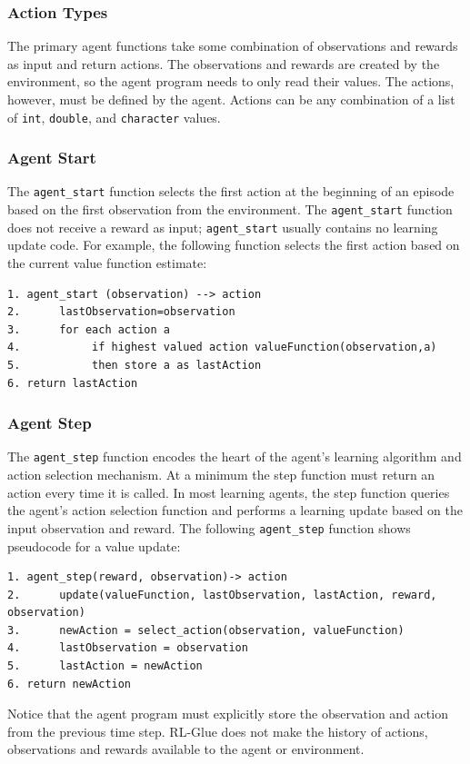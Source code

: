 \documentclass[11pt]{article}
\begin{document}
\subsubsection{Action Types}
The primary agent functions take some combination of observations and rewards as input and return actions. The observations and rewards are created by the environment, so the agent program needs to only read their values. The actions, however, must be defined by the agent. Actions can be any combination of a list of \texttt{int}, \texttt{double}, and \texttt{character} values.

\subsubsection{Agent Start}
The \texttt{agent\_start} function selects the first action at the beginning of an episode based on the first observation from the environment. The \texttt{agent\_start} function does not receive a reward as input; \texttt{agent\_start} usually contains no learning update code. For example, the following function selects the first action based on the current value function estimate:
\begin{verbatim}
1. agent_start (observation) --> action
2.      lastObservation=observation
3.      for each action a
4.           if highest valued action valueFunction(observation,a)
5.           then store a as lastAction
6. return lastAction
\end{verbatim}

\subsubsection{Agent Step}
The \texttt{agent\_step} function encodes the heart of the agent's learning algorithm and action selection mechanism. At a minimum the step function must return an action every time it is called. In most learning agents, the step function queries the agent's action selection function and performs a learning update based on the input observation and reward. The following \texttt{agent\_step} function shows pseudocode for a value update:
\begin{verbatim}
1. agent_step(reward, observation)-> action
2.      update(valueFunction, lastObservation, lastAction, reward, observation)
3.      newAction = select_action(observation, valueFunction)
4.      lastObservation = observation
5.      lastAction = newAction
6. return newAction
\end{verbatim}  
Notice that the agent program must explicitly store the observation and action from the previous time step. RL-Glue does not make the history of actions, observations and rewards available to the agent or environment.
\end{document}

